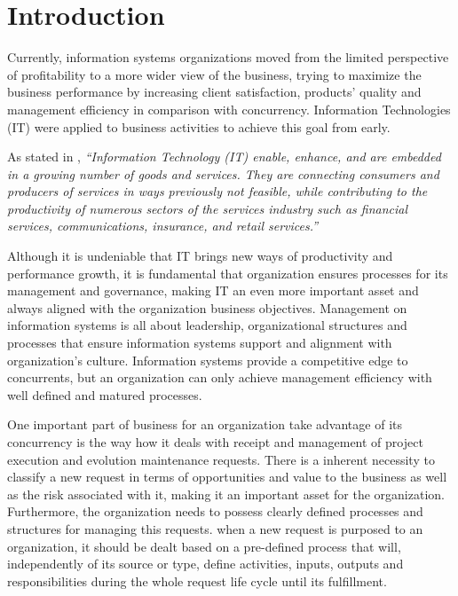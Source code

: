
% 
% 

\section{Introduction}


Currently, information systems organizations moved from the limited perspective of profitability to a more wider view of the business, trying to maximize the business performance by increasing client satisfaction, products' quality and management efficiency in comparison with concurrency. Information Technologies (IT) were applied to business activities to achieve this goal from early.\par 
As stated in \cite{itilSS}, \textit{``Information Technology (IT) enable, enhance, and are embedded in a growing number of goods and services. They are connecting consumers and producers of services in ways previously not feasible, while contributing to the productivity of numerous sectors of the services industry such as financial services, communications, insurance, and retail services.''}\par
Although it is undeniable that IT brings new ways of productivity and performance growth, it is fundamental that organization ensures processes for its management and governance, making IT an even more important asset and always aligned with the organization business objectives. Management on information systems is all about leadership, organizational structures and processes that ensure information systems support and alignment with organization's culture. Information systems provide a competitive edge to concurrents, but an organization can only achieve management efficiency with well defined and matured processes.\par
One important part of business for an organization take advantage of its concurrency is the way how it deals with receipt and management of project execution and evolution maintenance requests. There is a inherent necessity to classify a new request in terms of opportunities  and value to the business as well as the risk associated with it, making it an important asset for the organization. Furthermore, the organization needs to possess clearly defined processes and structures for managing this requests. when a new request is purposed to an organization, it should be dealt based on a pre-defined process that will, independently of its source or type, define activities, inputs, outputs and responsibilities during the whole request life cycle until its fulfillment. \par
